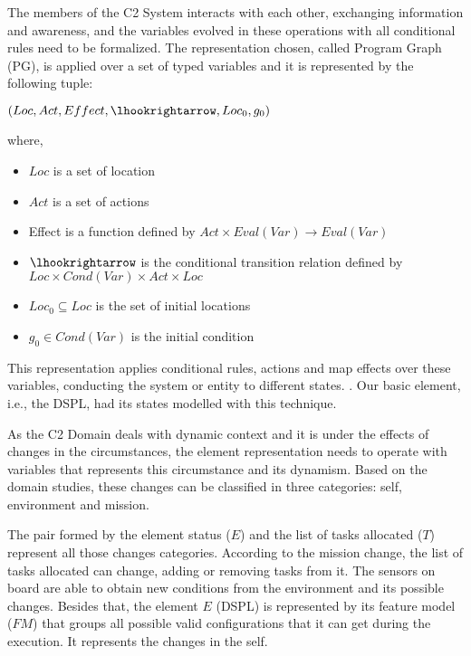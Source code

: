 The members of the C2 System interacts with each other, exchanging information and awareness, and the variables evolved in these operations with all conditional rules need to be formalized. The representation chosen, called Program Graph (PG), is applied over a set of typed variables and it is represented by the following tuple:

\begin{center}
    $(Loc,Act,Effect,\lhookrightarrow,Loc_0,g_0)$
\end{center}

where,

\begin{itemize}
	\item $Loc$ is a set of location  
	\item $Act$ is a set of actions
	\item Effect is a function defined by $Act \times Eval(Var) \to Eval(Var)$
	\item $\lhookrightarrow$ is the conditional transition relation defined by $Loc \times Cond(Var) \times Act \times Loc$
	\item $Loc_0 \subseteq Loc$ is the set of initial locations
	\item $g_0 \in Cond(Var)$ is the initial condition
\end{itemize}


This representation applies conditional rules, actions and map effects over these variables, conducting the system or entity to different states. \cite{baier}. Our basic element, i.e., the DSPL, had its states modelled with this technique.

As the C2 Domain deals with dynamic context and it is under the effects of changes in the circumstances, the element representation needs to operate with variables that represents this circumstance and its dynamism. Based on the domain studies, these changes can be classified in three categories: self, environment and mission.

The pair formed by the element status ($E$) and the list of tasks allocated ($T$) represent all those changes categories. According to the mission change, the list of tasks allocated can change, adding or removing tasks from it. The sensors on board are able to obtain new conditions from the environment and its possible changes. Besides that, the element $E$ (DSPL) is represented by its feature model ($FM$) that groups all possible valid configurations that it can get during the execution. It represents the changes in the self.

